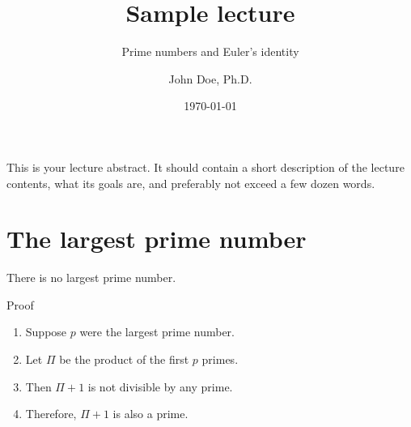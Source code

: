 \title{Sample lecture}
\subtitle{Prime numbers and Euler's identity}
\date{\today}
\author{John Doe, Ph.D.}

\graphicspath{{./graphics/}}





\maketitle

\mode*  %

This is your lecture abstract. It should contain a short description of the lecture contents, what its goals are, and preferably not exceed a few dozen words.

\section{The largest prime number}

\begin{frame}
  \begin{theorem}
    There is no largest prime number.
  \end{theorem}%
  \pause
  \begin{block}{Proof}
    \begin{enumerate}
      \item<alert@2> Suppose $p$ were the largest prime number.
      \item<alert@3> Let $\Pi$ be the product of the first $p$ primes.
      \item<alert@4> Then $\Pi + 1$ is not divisible by any prime.
      \item<alert@5> Therefore, $\Pi + 1$ is also a prime. \qedhere
    \end{enumerate}
  \end{block}
\end{frame}

